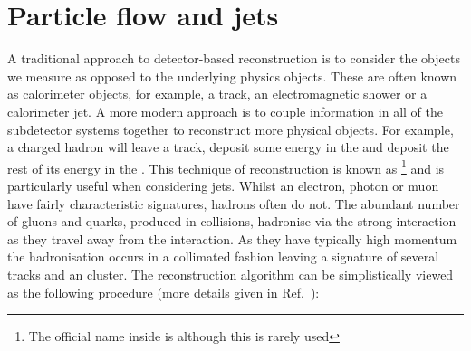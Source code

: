 \section{Particle flow and jets}
\label{sec:pflow_jets}
A traditional approach to detector-based reconstruction is to consider the objects we measure as opposed to the underlying physics objects. These are often known as calorimeter objects, for example, a track, an electromagnetic shower or a calorimeter jet. A more modern approach is to couple information in all of the subdetector systems together to reconstruct more physical objects. For example, a charged hadron will leave a track, deposit some energy in the \ECAL and deposit the rest of its energy in the \HCAL. This technique of reconstruction is known as \PF\footnote{The official name inside \CMS is \GED although this is rarely used} and is particularly useful when considering jets. Whilst an electron, photon or muon have fairly characteristic signatures, hadrons often do not. The abundant number of gluons and quarks, produced in \LHC collisions, hadronise via the strong interaction as they travel away from the interaction. As they have typically high momentum the hadronisation occurs in a collimated fashion leaving a signature of several tracks and an \HCAL cluster. The \PF reconstruction algorithm can be simplistically viewed as the following procedure (more details given in Ref.~\cite{cms_pf_algo}):

